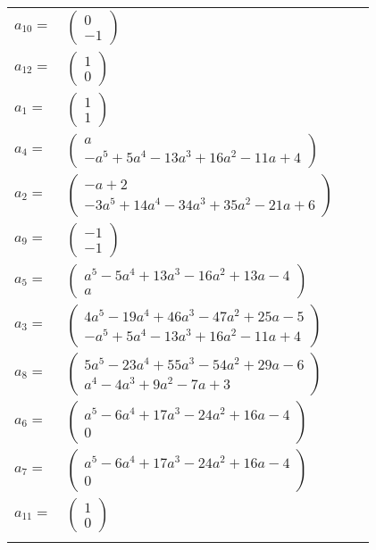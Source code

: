 \documentclass[1p]{elsarticle_modified}
\theoremstyle{definition}
\begin{document}
\begin{tabular}{m{7pt} m{180pt} m{7pt} m{180pt} }
\flushright $a_{10}=$&$\begin{pmatrix}0\\-1\end{pmatrix}$ \\
\flushright $a_{12}=$&$\begin{pmatrix}1\\0\end{pmatrix}$ \\
\flushright $a_{1}=$&$\begin{pmatrix}1\\1\end{pmatrix}$ \\
\flushright $a_{4}=$&$\begin{pmatrix}a\\- a^5+5 a^4-13 a^3+16 a^2-11 a+4\end{pmatrix}$ \\
\flushright $a_{2}=$&$\begin{pmatrix}- a+2\\-3 a^5+14 a^4-34 a^3+35 a^2-21 a+6\end{pmatrix}$ \\
\flushright $a_{9}=$&$\begin{pmatrix}-1\\-1\end{pmatrix}$ \\
\flushright $a_{5}=$&$\begin{pmatrix}a^5-5 a^4+13 a^3-16 a^2+13 a-4\\a\end{pmatrix}$ \\
\flushright $a_{3}=$&$\begin{pmatrix}4 a^5-19 a^4+46 a^3-47 a^2+25 a-5\\- a^5+5 a^4-13 a^3+16 a^2-11 a+4\end{pmatrix}$ \\
\flushright $a_{8}=$&$\begin{pmatrix}5 a^5-23 a^4+55 a^3-54 a^2+29 a-6\\a^4-4 a^3+9 a^2-7 a+3\end{pmatrix}$ \\
\flushright $a_{6}=$&$\begin{pmatrix}a^5-6 a^4+17 a^3-24 a^2+16 a-4\\0\end{pmatrix}$ \\
\flushright $a_{7}=$&$\begin{pmatrix}a^5-6 a^4+17 a^3-24 a^2+16 a-4\\0\end{pmatrix}$ \\
\flushright $a_{11}=$&$\begin{pmatrix}1\\0\end{pmatrix}$\\&\end{tabular}
\end{document}
